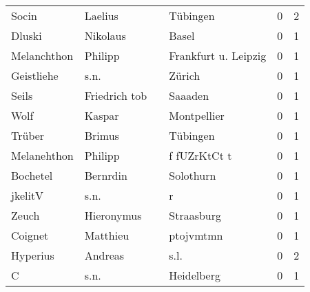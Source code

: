\begin{tabular}{llllrr}
                    Socin &                            Laelius &             &                                    Tübingen &          0 &         2 \\
                   Dluski &                           Nikolaus &             &                                       Basel &          0 &         1 \\
              Melanchthon &                            Philipp &             &                        Frankfurt u. Leipzig &          0 &         1 \\
               Geistliehe &                               s.n. &             &                                      Zürich &          0 &         1 \\
                    Seils &                      Friedrich tob &             &                                     Saaaden &          0 &         1 \\
                     Wolf &                             Kaspar &             &                                 Montpellier &          0 &         1 \\
                   Trüber &                             Brimus &             &                                    Tübingen &          0 &         1 \\
              Melanehthon &                            Philipp &             &                                f fUZrKtCt t &          0 &         1 \\
                 Bochetel &                           Bernrdin &             &                                   Solothurn &          0 &         1 \\
                  jkelitV &                               s.n. &             &                                           r &          0 &         1 \\
                    Zeuch &                         Hieronymus &             &                                  Straasburg &          0 &         1 \\
                  Coignet &                           Matthieu &             &                                   ptojvmtmn &          0 &         1 \\
                 Hyperius &                            Andreas &             &                                        s.l. &          0 &         2 \\
                        C &                               s.n. &             &                                  Heidelberg &          0 &         1 \\

\end{tabular}
